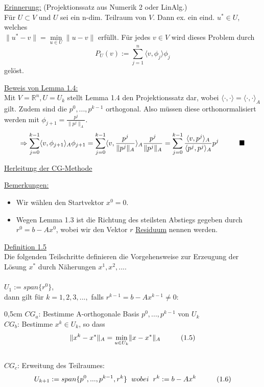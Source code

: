 \documentclass[a4paper]{letter}
\begin{document}
\underline{Erinnerung:} (Projektionssatz aus Numerik 2 oder LinAlg.)
\\F\"ur $U \subset V$ und $U$ sei ein n-dim. Teilraum von $V$. Dann ex. ein eind. $u^{*} \in U$, welches
\\$\|u^{*} - v\| = \underset{u \in U}{\min} \|u - v\|$ erf\"ullt. F\"ur jedes $v \in V$ wird dieses Problem durch
$$P_{U}(v) := \sum_{j=1}^{n} \langle v, \phi_{j} \rangle \phi_{j}$$
gel\"ost.

\underline{Beweis von Lemma 1.4:}
\\Mit $V = \mathbb{R}^{n}, U = U_{k}$ stellt Lemma 1.4 den Projektionssatz dar, wobei $\langle \cdot, \cdot \rangle = \langle \cdot, \cdot \rangle _{A}$ gilt. Zudem sind die $p^{0},...,p^{k-1}$ orthogonal. Also m\"ussen diese orthonormalisiert werden mit $\phi_{j+1} = \frac {p^{j}} {\|p^{j}\|_{A}}$.
$$\Rightarrow \sum_{j=0}^{k-1} \langle v, \phi_{j+1} \rangle _{A} \phi_{j+1} =
\sum_{j=0}^{k-1} \langle v, {\frac {p^{j}} {\|p^{j}\|_{A}}} \rangle _{A} \frac {p^{j}} {\|p^{j}\|_{A}} =
\sum_{j=0}^{k-1} \frac {\langle v, p^{j} \rangle _{A}} {\langle p^{j}, p^{j} \rangle _{A}} p^{j} \hspace{10mm} \blacksquare$$

\begin{center}
\underline{Herleitung der CG-Methode}
\end{center}
\underline{Bemerkungen:}
\begin{itemize}
	\item Wir w\"ahlen den Startvektor $x^{0} = 0$.
	\item Wegen Lemma 1.3 ist die Richtung des steilsten Abstiegs gegeben durch $r^{0} = b - Ax^{0}$, wobei wir den Vektor $r$ \underline{Residuum} nennen werden.
\end{itemize}

\underline{Definition 1.5}
\\Die folgenden Teilschritte definieren die Vorgehensweise zur Erzeugung der L\"osung $x^{*}$ durch N\"aherungen $x^{1}, x^{2},...$.
\\\\$U_{1} := span\{r^{0}\}$,
\\dann gilt f\"ur $k = 1,2,3,...,$ falls $r^{k-1} = b - Ax^{k-1} \ne 0$:
\begin{addmargin}[0,5cm]{0,5cm}
$CG_{a}$: Bestimme A-orthogonale Basis $p^{0},...,p^{k-1}$ von $U_{k}$
\\$CG_{b}$: Bestimme $x^{k} \in U_{k}$, so dass
$$\|x^{k} - x^{*}\|_{A} = \underset{u \in U_{k}}{\min} \|x - x^{*}\|_{A} \hspace{10mm} (1.5)$$
\\$CG_{c}$: Erweitung des Teilraumes:
$$U_{k+1} := span\{p^{0},...,p^{k-1},r^{k}\} \hspace{2mm} wobei \hspace{2mm} r^{k} := b - Ax^{k} \hspace{10mm} (1.6)$$
\end{addmargin}
\end{document}
